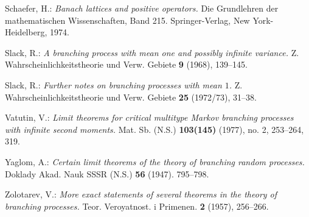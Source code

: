 \documentclass[12pt,a4paper]{amsart}
\def\MR#1{\href{http://www.ams.org/mathscinet-getitem?mr=#1}{MR-#1}}
\theoremstyle{definition}
\numberwithin{equation}{section}
\begin{document}
\begin{thebibliography}{10}
	Schaefer, H.:
	\emph{Banach lattices and positive operators.}
	Die Grundlehren der mathematischen Wissenschaften, Band 215. Springer-Verlag, New York-Heidelberg, 1974.
	
	Slack, R.:
	\emph{A branching process with mean one and possibly infinite variance.}
	Z. Wahrscheinlichkeitstheorie und Verw. Gebiete \textbf{9} (1968), 139--145.
	
	Slack, R.:
  \emph{Further notes on branching processes with mean {$1$}.}
	Z. Wahrscheinlichkeitstheorie und Verw. Gebiete \textbf{25} (1972/73), 31–38.
	
	Vatutin, V.:
	\emph{Limit theorems for critical multitype Markov branching processes with infinite second moments.}
	Mat. Sb. (N.S.) \textbf{103(145)} (1977), no. 2, 253–264, 319.
	
	Yaglom, A.:
	\emph{Certain limit theorems of the theory of branching random processes.}
	Doklady Akad. Nauk SSSR (N.S.) \textbf{56} (1947). 795–798.
	
	Zolotarev, V.:
	\emph{More exact statements of several theorems in the theory of branching processes.}
	Teor. Veroyatnost. i Primenen. \textbf{2} (1957), 256–266.
	
\end{thebibliography}
\end{document}
